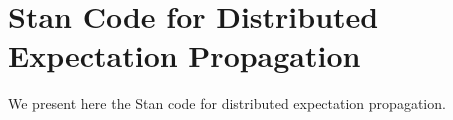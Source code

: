 \chapter{Stan Code for Distributed Expectation Propagation}
\label{sec:appendix_stan_ode}

We present here the Stan code for distributed expectation propagation.

\texttt{}
